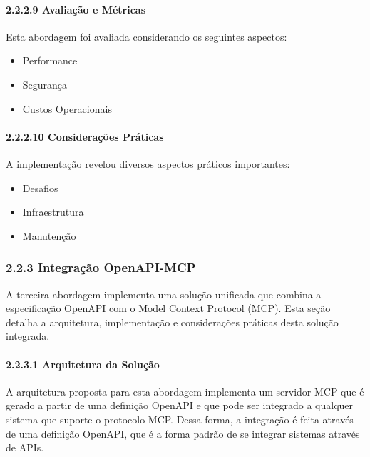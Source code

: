 \documentclass[
]{article}
\providecommand{\tightlist}{%
  \setlength{\itemsep}{0pt}\setlength{\parskip}{0pt}}
\begin{document}
\paragraph{2.2.2.9 Avaliação e
Métricas}\label{avaliauxe7uxe3o-e-muxe9tricas}

Esta abordagem foi avaliada considerando os seguintes aspectos:

\begin{itemize}
\tightlist
\item
  Performance
\item
  Segurança
\item
  Custos Operacionais
\end{itemize}

\paragraph{2.2.2.10 Considerações
Práticas}\label{considerauxe7uxf5es-pruxe1ticas}

A implementação revelou diversos aspectos práticos importantes:

\begin{itemize}
\tightlist
\item
  Desafios
\item
  Infraestrutura
\item
  Manutenção
\end{itemize}

\subsubsection{2.2.3 Integração
OpenAPI-MCP}\label{integrauxe7uxe3o-openapi-mcp}

A terceira abordagem implementa uma solução unificada que combina a
especificação OpenAPI com o Model Context Protocol (MCP). Esta seção
detalha a arquitetura, implementação e considerações práticas desta
solução integrada.

\paragraph{2.2.3.1 Arquitetura da
Solução}\label{arquitetura-da-soluuxe7uxe3o-1}

A arquitetura proposta para esta abordagem implementa um servidor MCP
que é gerado a partir de uma definição OpenAPI e que pode ser integrado
a qualquer sistema que suporte o protocolo MCP. Dessa forma, a
integração é feita através de uma definição OpenAPI, que é a forma
padrão de se integrar sistemas através de APIs.
\end{document}
